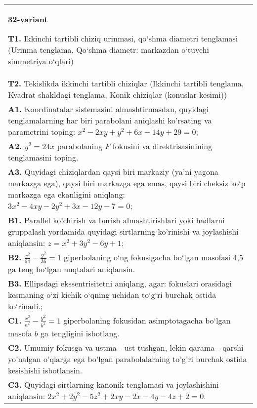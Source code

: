 \documentclass{article}
\begin{document}
\begin{tabular}{m{17cm}}
\textbf{32-variant}
\newline

\textbf{T1.} Ikkinchi tartibli chiziq urinmasi, qo‘shma diametri tenglamasi (Urinma tenglama, Qo‘shma diametr: markazdan o‘tuvchi simmetriya o‘qlari) \\
\textbf{T2.} Tekislikda ikkinchi tartibli chiziqlar (Ikkinchi tartibli tenglama, Kvadrat shakldagi tenglama, Konik chiziqlar (konuslar kesimi)) \\
\textbf{A1.} Koordinatalar sistemasini almashtirmasdan, quyidagi tenglamalarning har biri parabolani aniqlashi ko'rsating va parametrini toping: $x^2-2 x y+y^2+6 x-14 y+29=0$; \\
\textbf{A2.} $y^2=24 x$ parabolaning $F$ fokusini va direktrisasinining tenglamasini toping. \\
\textbf{A3.} Quyidagi chiziqlardan qaysi biri markaziy (ya’ni yagona markazga ega), qaysi biri markazga ega emas, qaysi biri cheksiz ko‘p markazga ega ekanligini aniqlang: $3 x^2-4 x y-2 y^2+3 x-12 y-7=0$; \\
\textbf{B1.} Parallel ko'chirish va burish almashtirishlari yoki hadlarni gruppalash yordamida quyidagi sirtlarning ko'rinishi va joylashishi aniqlansin: $z=x^2+3 y^2-6 y+1$; \\
\textbf{B2.} $\frac{x^2}{64}-\frac{y^2}{36}=1$ giperbolaning o‘ng fokusigacha bo‘lgan masofasi 4,5 ga teng bo‘lgan nuqtalari aniqlansin. \\
\textbf{B3.} Ellipsdagi ekssentrisitetni aniqlang, agar: fokuslari orasidagi kesmaning o‘zi kichik o‘qning uchidan to‘g‘ri burchak ostida ko‘rinadi.; \\
\textbf{C1.} $\frac{x^2}{a^2}-\frac{y^2}{b^2}=1$ giperbolaning fokusidan asimptotagacha bo‘lgan masofa $b$ ga tengligini isbotlang. \\
\textbf{C2.} Umumiy fokusga va ustma - ust tushgan, lekin qarama - qarshi yo'nalgan o'qlarga ega bo'lgan parabolalarning to'g'ri burchak ostida kesishishi isbotlansin. \\
\textbf{C3.} Quyidagi sirtlarning kanonik tenglamasi va joylashishini aniqlansin: $2 x^2+2 y^2-5 z^2+2 x y-2 x-4 y-4 z+2=0$. \\

\end{tabular}
\vspace{1cm}
\end{document}
